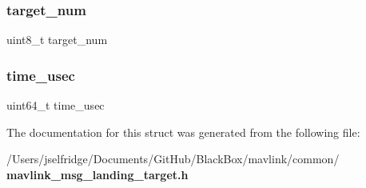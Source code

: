 \mbox{\label{struct____mavlink__landing__target__t_a07392edb70a2988a66da029a41c786b4}} 
\subsubsection{target\+\_\+num}
{\footnotesize\ttfamily uint8\+\_\+t target\+\_\+num}

\mbox{\label{struct____mavlink__landing__target__t_a2db60704c293664dcb6159b55c98c2f2}} 
\subsubsection{time\+\_\+usec}
{\footnotesize\ttfamily uint64\+\_\+t time\+\_\+usec}



The documentation for this struct was generated from the following file\+:\begin{DoxyCompactItemize}
\item 
/\+Users/jselfridge/\+Documents/\+Git\+Hub/\+Black\+Box/mavlink/common/\textbf{ mavlink\+\_\+msg\+\_\+landing\+\_\+target.\+h}\end{DoxyCompactItemize}
